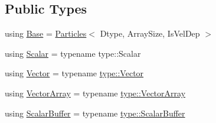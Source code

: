 \subsection*{Public Types}
\begin{DoxyCompactItemize}
\item 
using \mbox{\hyperlink{class_space_h_1_1_regu_particles_a1d863fa181a9871459539c11d18d5f10}{Base}} = \mbox{\hyperlink{struct_space_h_1_1_particles}{Particles}}$<$ Dtype, Array\+Size, Is\+Vel\+Dep $>$
\item 
using \mbox{\hyperlink{class_space_h_1_1_regu_particles_ae2831b4f4434150ac51be629012d383d}{Scalar}} = typename type\+::\+Scalar
\item 
using \mbox{\hyperlink{class_space_h_1_1_regu_particles_aefe83926ebdcf1f06d980d02a44fe486}{Vector}} = typename \mbox{\hyperlink{struct_space_h_1_1_proto_type_a316b81f4660b2b4fab14a8e1f23b6089}{type\+::\+Vector}}
\item 
using \mbox{\hyperlink{class_space_h_1_1_regu_particles_aef5ee8d2bab734a42f9b79f96ebf05ca}{Vector\+Array}} = typename \mbox{\hyperlink{struct_space_h_1_1_proto_type_a622b8e122b33bb4966a02299fb7b82d6}{type\+::\+Vector\+Array}}
\item 
using \mbox{\hyperlink{class_space_h_1_1_regu_particles_a49987a2ea42df368ebbf75200efc5439}{Scalar\+Buffer}} = typename \mbox{\hyperlink{struct_space_h_1_1_proto_type_a62c491884996da10377d348a5aabad86}{type\+::\+Scalar\+Buffer}}
\end{DoxyCompactItemize}
